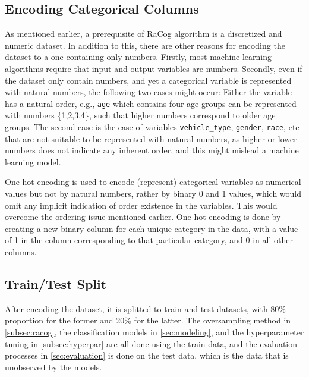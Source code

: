 \documentclass{article}
\begin{document}
\hypertarget{encoding-categorical-columns}{%
\subsection{\texorpdfstring{Encoding Categorical Columns
\label{subsec:encode}}{Encoding Categorical Columns }}\label{encoding-categorical-columns}}

As mentioned earlier, a prerequisite of RaCog algorithm is a discretized
and numeric dataset. In addition to this, there are other reasons for
encoding the dataset to a one containing only numbers. Firstly, most
machine learning algorithms require that input and output variables are
numbers. Secondly, even if the dataset only contain numbers, and yet a
categorical variable is represented with natural numbers, the following
two cases might occur: Either the variable has a natural order, e.g.,
\texttt{age} which contains four age groups can be represented with
numbers \{1,2,3,4\}, such that higher numbers correspond to older age
groups. The second case is the case of variables \texttt{vehicle\_type},
\texttt{gender}, \texttt{race}, etc that are not suitable to be
represented with natural numbers, as higher or lower numbers does not
indicate any inherent order, and this might mislead a machine learning
model.

One-hot-encoding is used to encode (represent) categorical variables as
numerical values but not by natural numbers, rather by binary 0 and 1
values, which would omit any implicit indication of order existence in
the variables. This would overcome the ordering issue mentioned earlier.
One-hot-encoding is done by creating a new binary column for each unique
category in the data, with a value of 1 in the column corresponding to
that particular category, and 0 in all other columns.

\hypertarget{traintest-split}{%
\subsection{\texorpdfstring{Train/Test Split
\label{subsec:split}}{Train/Test Split }}\label{traintest-split}}

After encoding the dataset, it is splitted to train and test datasets,
with 80\% proportion for the former and 20\% for the latter. The
oversampling method in \ref{subsec:racog}, the classification models in
\ref{sec:modeling}, and the hyperparameter tuning in
\ref{subsec:hyperpar} are all done using the train data, and the
evaluation processes in \ref{sec:evaluation} is done on the test data,
which is the data that is unobserved by the models.
\end{document}
